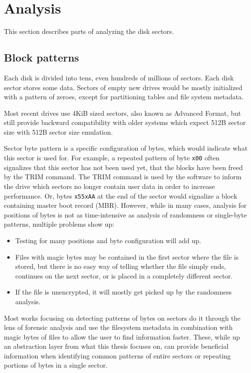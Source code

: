 \documentclass[
  digital, %
  oneside, %
  lof,     %
  lot,     %
]{fithesis4}
\begin{document}
\section{Analysis}
This section describes parts of analyzing the disk sectors.

\subsection{Block patterns}
Each disk is divided into tens, even hundreds of millions of sectors.
Each disk sector stores some data.
Sectors of empty new drives would be mostly initialized with a pattern of zeroes, except for partitioning tables and file system metadata.

Most recent drives use 4KiB sized sectors, also known as Advanced Format, but still provide backward compatibility with older systems which expect 512B sector size with 512B sector size emulation.\cite{seagate}

Sector byte pattern is a specific configuration of bytes, which would indicate what this sector is used for.
For example, a repeated pattern of byte \texttt{x00} often signalizes that this sector has not been used yet, that the blocks have been freed by the TRIM command.
The TRIM command is used by the software to inform the drive which sectors no longer contain user data in order to increase performance.\cite{mcmillen21}
Or, bytes \texttt{x55xAA} at the end of the sector would signalize a block containing master boot record (MBR).
However, while in many cases, analysis for positions of bytes is not as time-intensive as analysis of randomness or single-byte patterns, multiple problems show up:
\begin{itemize}
    \item Testing for many positions and byte configuration will add up.
    \item Files with magic bytes may be contained in the first sector where the file is stored, but there is no easy way of telling whether the file simply ends, continues on the next sector, or is placed in a completely different sector.
    \item If the file is unencrypted, it will mostly get picked up by the randomness analysis.
\end{itemize}

Most works focusing on detecting patterns of bytes on sectors\cite{foster12, garfmccar15} do it through the lens of forensic analysis and use the filesystem metadata in combination with magic bytes of files to allow the user to find information faster.
These, while up an abstraction layer from what this thesis focuses on, can provide beneficial information when identifying common patterns of entire sectors or repeating portions of bytes in a single sector.\cite{foster12}
\end{document}
